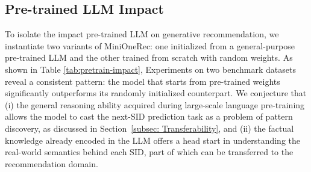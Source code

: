 \begin{table}[]
\caption{Performance of MiniOneRec initialized with pre-trained weights versus random initialization across two domains} 
\label{tab:pretrain-impact}
\end{table}


\subsection{Pre-trained LLM Impact}
\label{llmmatter}
To isolate the impact pre-trained LLM on generative recommendation, we instantiate two variants of MiniOneRec: one initialized from a general-purpose pre-trained LLM and the other trained from scratch with random weights. As shown in Table \ref{tab:pretrain-impact}, Experiments on two benchmark datasets reveal a consistent pattern: the model that starts from pre-trained weights significantly outperforms its randomly initialized counterpart. We conjecture that (i) the general reasoning ability acquired during large-scale language pre-training allows the model to cast the next-SID prediction task as a problem of pattern discovery, as discussed in Section~\ref{subsec: Transferability}, and (ii) the factual knowledge already encoded in the LLM offers a head start in understanding the real-world semantics behind each SID, part of which can be transferred to the recommendation domain.